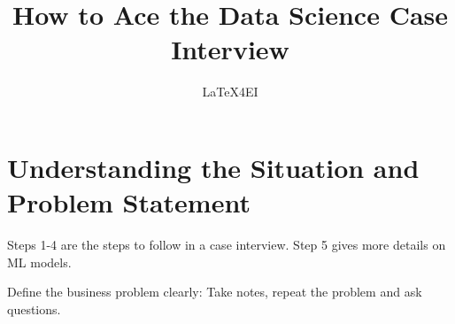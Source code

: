 \documentclass[english, threecolumn]{latex4ei/latex4ei_sheet}
\title{How to Ace the Data Science Case Interview }
\author{LaTeX4EI}					%
\begin{document}
\ifdefined\GitRevision{}\fi

\maketitle   %


\section{Understanding the Situation and Problem Statement}
\begin{sectionbox}
\begin{symbolbox}
Steps 1-4 are the steps to follow in a case interview. Step 5 gives more details on ML models.
\end{symbolbox}
    Define the business problem clearly: Take notes, repeat the problem and ask questions. 
\end{sectionbox}
\end{document}
